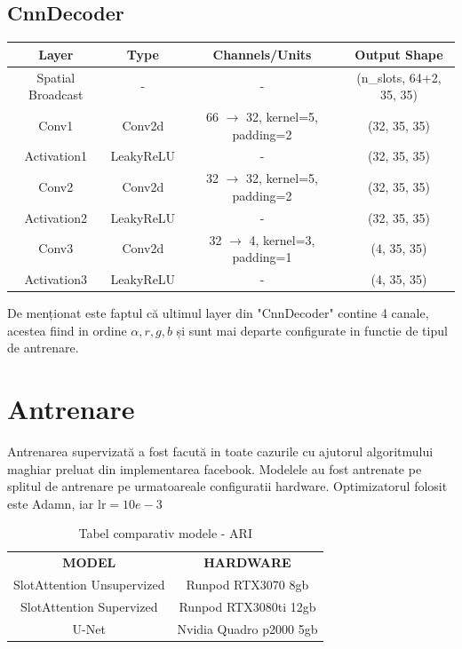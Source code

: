 \subsection*{CnnDecoder}
\begin{tabular}{|c|c|c|c|}
\hline
Layer & Type & Channels/Units & Output Shape \\
\hline
Spatial Broadcast & - & - & (n\_slots, 64+2, 35, 35) \\
Conv1 & Conv2d & 66 $\rightarrow$ 32, kernel=5, padding=2 & (32, 35, 35) \\
Activation1 & LeakyReLU & - & (32, 35, 35) \\
Conv2 & Conv2d & 32 $\rightarrow$ 32, kernel=5, padding=2 & (32, 35, 35) \\
Activation2 & LeakyReLU & - & (32, 35, 35) \\
Conv3 & Conv2d & 32 $\rightarrow$ 4, kernel=3, padding=1 & (4, 35, 35) \\
Activation3 & LeakyReLU & - & (4, 35, 35) \\
\hline
\end{tabular}

De menționat este faptul că ultimul layer din "CnnDecoder" contine 4 canale, acestea fiind in ordine $\alpha,r,g,b$ și sunt mai departe configurate in functie de tipul de antrenare.

\section{Antrenare}

Antrenarea supervizată a fost facută in toate cazurile cu ajutorul algoritmului maghiar\cite{DBLP:journals/corr/abs-2005-12872} preluat din implementarea facebook.
Modelele au fost antrenate pe splitul de antrenare pe urmatoareale configuratii hardware.
Optimizatorul folosit este Adamn, iar $\text{lr}=10e-3$

\begin{table}[h!]
	\centering
	\begin{tabular}{|c|c|}
		\hline
		\textbf{MODEL}             & \textbf{HARDWARE} \\
    SlotAttention Unsupervized & Runpod RTX3070 8gb  \\
		\hline
		SlotAttention Supervized   & Runpod RTX3080ti 12gb        \\
		\hline
		U-Net                       & Nvidia Quadro p2000 5gb \\
    \hline
	\end{tabular}
	\caption{Tabel comparativ modele - ARI}
\end{table}



